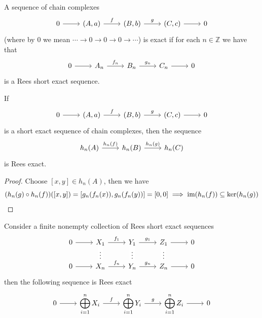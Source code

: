 \begin{definition}
    A sequence of chain complexes 
\[\begin{tikzcd}
	0 & {(A,a)} & {(B,b)} & {(C,c)} & 0
	\arrow[from=1-1, to=1-2]
	\arrow["f", from=1-2, to=1-3]
	\arrow["g", from=1-3, to=1-4]
	\arrow[from=1-4, to=1-5]
\end{tikzcd}\]
    (where by $0$ we mean $\cdots\to 0\to0\to0\to\cdots$) is exact 
    if for each $n\in\mathbb{Z}$ we have that 
    \[\begin{tikzcd}
	0 & {A_n} & {B_n} & {C_n} & 0
        \arrow[from=1-1, to=1-2]
        \arrow["{f_n}", from=1-2, to=1-3]
        \arrow["{g_n}", from=1-3, to=1-4]
        \arrow[from=1-4, to=1-5]
    \end{tikzcd}\]
    is a Rees short exact sequence.
\end{definition}
\begin{proposition}
    If 
        \[\begin{tikzcd}
        0 & {(A,a)} & {(B,b)} & {(C,c)} & 0
        \arrow[from=1-1, to=1-2]
        \arrow["f", from=1-2, to=1-3]
        \arrow["g", from=1-3, to=1-4]
        \arrow[from=1-4, to=1-5]
    \end{tikzcd}\]
    is a short exact sequence of chain complexes, then the sequence
    \[\begin{tikzcd}
	{h_n(A)} & {h_n(B)} & {h_n(C)}
	\arrow["{h_n(f)}", from=1-1, to=1-2]
	\arrow["{h_n(g)}", from=1-2, to=1-3]
    \end{tikzcd}\]
    is Rees exact.
\end{proposition}
\begin{proof}[Proof]
    Choose $[x,y]\in h_n(A)$, then we have 
    \[
        (h_n(g)\circ h_n(f))([x,y]) = [g_n(f_n(x)),g_n(f_n(y))] = [0,0] \implies \text{im}(h_n(f))\subseteq\ker(h_n(g))
    \]
\end{proof}
\begin{proposition}
    Consider a finite nonempty collection of Rees short exact sequences 
    \[\begin{tikzcd}
        0 & {X_1} & {Y_1} & {Z_1} & 0 \\
        0 & {X_n} & {Y_n} & {Z_n} & 0
        \arrow[from=1-1, to=1-2]
        \arrow["{f_1}", from=1-2, to=1-3]
        \arrow["\vdots"{description, pos=0.4}, draw=none, from=1-2, to=2-2]
        \arrow["{g_1}", from=1-3, to=1-4]
        \arrow["\vdots"{description, pos=0.4}, draw=none, from=1-3, to=2-3]
        \arrow[from=1-4, to=1-5]
        \arrow["\vdots"{description, pos=0.4}, draw=none, from=1-4, to=2-4]
        \arrow[from=2-1, to=2-2]
        \arrow["{f_n}", from=2-2, to=2-3]
        \arrow["{g_n}", from=2-3, to=2-4]
        \arrow[from=2-4, to=2-5]
    \end{tikzcd}\]
    then the following sequence is Rees exact
    \[\begin{tikzcd}
        0 & {\displaystyle\bigoplus_{i=1}^n X_i} & {\displaystyle\bigoplus_{i=1}^n Y_i} & {\displaystyle\bigoplus_{i=1}^n Z_i} & 0
        \arrow[from=1-1, to=1-2]
        \arrow["f", from=1-2, to=1-3]
        \arrow["g", from=1-3, to=1-4]
        \arrow[from=1-4, to=1-5]
    \end{tikzcd}\]
\end{proposition}
